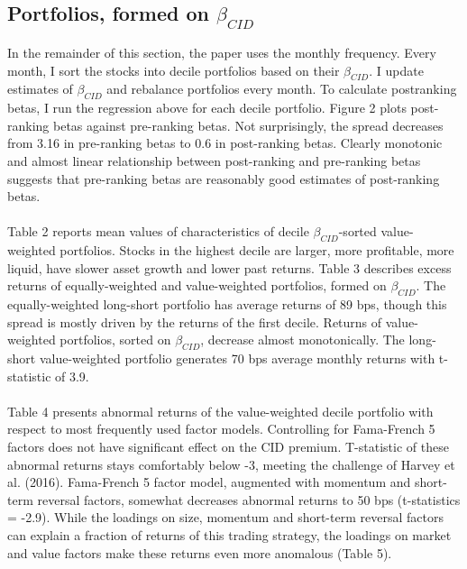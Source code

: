 \documentclass[12pt]{article}
\begin{document}
\subsection{Portfolios, formed on $\beta_{CID}$}

In the remainder of this section, the paper uses the monthly frequency. Every month, I sort the stocks into decile portfolios based on their $\beta_{CID}$. I update estimates of $\beta_{CID}$ and rebalance portfolios every month. To calculate postranking betas, I run the  regression above for each decile portfolio. Figure 2 plots post-ranking betas against pre-ranking betas. Not surprisingly, the spread decreases from 3.16 in pre-ranking betas to 0.6 in post-ranking betas. Clearly monotonic and almost linear relationship between post-ranking and pre-ranking betas suggests that pre-ranking betas are reasonably good estimates of post-ranking betas. 
\paragraph{}
Table 2 reports mean values of characteristics of decile $\beta_{CID}$-sorted value-weighted portfolios. Stocks in the highest decile are larger, more profitable, more liquid, have slower asset growth and lower past returns. Table 3 describes excess returns of equally-weighted and value-weighted portfolios, formed on $\beta_{CID}$. The equally-weighted long-short portfolio has average returns of 89 bps, though this spread is mostly driven by the returns of the first decile. Returns of value-weighted portfolios, sorted on $\beta_{CID}$, decrease almost monotonically. The long-short value-weighted portfolio generates 70 bps average monthly returns with t-statistic of 3.9. 
\paragraph{}
Table 4 presents abnormal returns of the value-weighted decile portfolio with respect to most frequently used factor models. Controlling for Fama-French 5 factors does not have significant effect on the CID premium. T-statistic of these abnormal returns stays comfortably below -3, meeting the challenge of Harvey et al. (2016). Fama-French 5 factor model, augmented with momentum and short-term reversal factors, somewhat decreases abnormal returns to 50 bps (t-statistics = -2.9). While the loadings on size, momentum and short-term reversal factors can explain a fraction of returns of this trading strategy, the loadings on market and value factors make these returns even more anomalous (Table 5).
\end{document}
